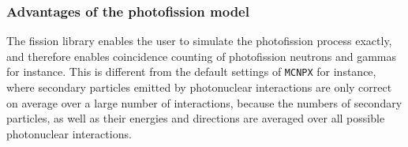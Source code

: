 \subsubsection*{Advantages of the photofission model}\label{sec:advantages of the photofission model}

The fission library enables the user to simulate the 
photofission process exactly, and therefore enables 
coincidence counting of photofission neutrons and gammas 
for instance. This is different from the default settings of
{\tt MCNPX} for instance, where secondary particles emitted by 
photonuclear interactions are only correct on average over a 
large number of interactions, because the numbers of secondary 
particles, as well as their energies and directions are 
averaged over all possible photonuclear interactions.  



